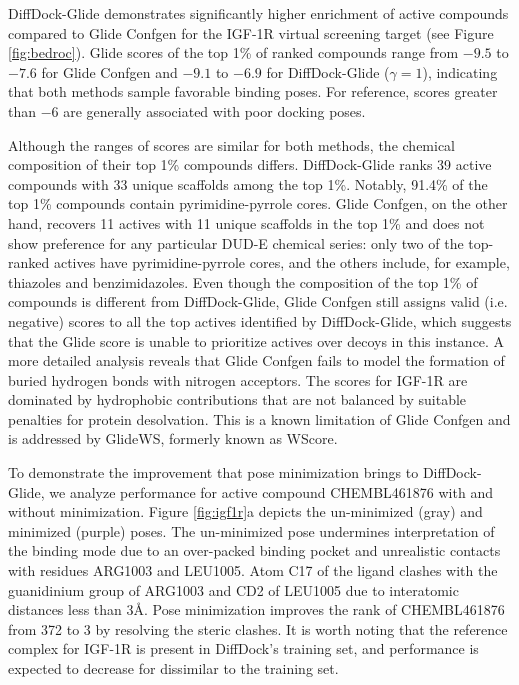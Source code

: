 \documentclass[letterpaper]{article}
\begin{document}
DiffDock-Glide demonstrates significantly higher enrichment of active compounds compared to Glide Confgen for the IGF-1R virtual screening target (see Figure \ref{fig:bedroc}). Glide scores of the top 1\% of ranked compounds range from $-9.5$ to $-7.6$ for Glide Confgen and $-9.1$ to $-6.9$ for DiffDock-Glide ($\gamma=1$), indicating that both methods sample favorable binding poses. For reference, scores greater than $-6$ are generally associated with poor docking poses.\cite{friesner2004glide}

Although the ranges of scores are similar for both methods, the chemical composition of their top 1\% compounds differs.
DiffDock-Glide ranks 39 active compounds with 33 unique scaffolds among the top 1\%. Notably, 91.4\% of the top 1\% compounds contain pyrimidine-pyrrole cores. Glide Confgen, on the other hand, recovers 11 actives with 11 unique scaffolds in the top 1\% and does not show preference for any particular DUD-E chemical series: only two of the top-ranked actives have pyrimidine-pyrrole cores, and the others include, for example, thiazoles and benzimidazoles. Even though the composition of the top 1\% of compounds is different from DiffDock-Glide, Glide Confgen still assigns valid (i.e. negative) scores to all the top actives identified by DiffDock-Glide, which suggests that the Glide score is unable to prioritize actives over decoys in this instance. A more detailed analysis reveals that Glide Confgen fails to model the formation of buried hydrogen bonds with nitrogen acceptors. The scores for IGF-1R are dominated by hydrophobic contributions that are not balanced by suitable penalties for protein desolvation. This is a known limitation of Glide Confgen and is addressed by GlideWS, formerly known as WScore.\cite{murphy2016wscore}

To demonstrate the improvement that pose minimization brings to DiffDock-Glide, we analyze performance for active compound CHEMBL461876 with and without minimization. Figure \ref{fig:igf1r}a depicts the un-minimized (gray) and minimized (purple) poses. The un-minimized pose undermines interpretation of the binding mode due to an over-packed binding pocket and unrealistic contacts with residues ARG1003 and LEU1005. Atom C17 of the ligand clashes with the guanidinium group of ARG1003 and CD2 of LEU1005 due to interatomic distances less than 3{\AA}. Pose minimization improves the rank of CHEMBL461876 from 372 to 3 by resolving the steric clashes. It is worth noting that the reference complex for IGF-1R is present in DiffDock's training set, and performance is expected to decrease for dissimilar to the training set.
\end{document}
